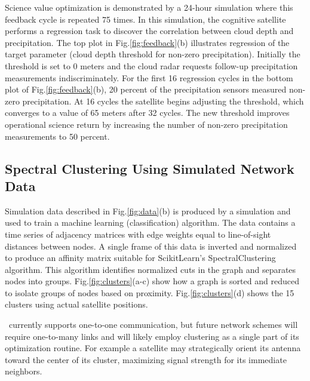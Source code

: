 \documentclass[conference]{IEEEtran}
\newcommand{\project}{{\sc{Collaborate}}~}
\begin{document}
Science value optimization is demonstrated by a 24-hour simulation where this feedback cycle is repeated 75 times.  In this simulation, the cognitive satellite performs a regression task to discover the correlation between cloud depth and precipitation.  The top plot in Fig.\ref{fig:feedback}(b) illustrates regression of the target parameter (cloud depth threshold for non-zero precipitation).  Initially the threshold is set to 0 meters and the cloud radar requests follow-up precipitation measurements indiscriminately.  For the first 16 regression cycles in the bottom plot of Fig.\ref{fig:feedback}(b), 20 percent of the precipitation sensors measured non-zero precipitation.  At 16 cycles the satellite begins adjusting the threshold, which converges to a value of 65 meters after 32 cycles.  The new threshold improves operational science return by increasing the number of non-zero precipitation measurements to 50 percent.

\subsection{Spectral Clustering Using Simulated Network Data}
\label{ssec:cluster}

Simulation data described in Fig.\ref{fig:data}(b) is produced by a simulation and used to train a machine learning (classification) algorithm.  The data contains a time series of adjacency matrices with edge weights equal to line-of-sight distances between nodes.  A single frame of this data is inverted and normalized to produce an affinity matrix suitable for ScikitLearn's SpectralClustering algorithm.  This algorithm identifies normalized cuts in the graph and separates nodes into groups.  Fig.\ref{fig:clusters}(a-c) show how a graph is sorted and reduced to isolate groups of nodes based on proximity.  Fig.\ref{fig:clusters}(d) shows the 15 clusters using actual satellite positions.

\project currently supports one-to-one communication, but future network schemes will require one-to-many links and will likely employ clustering as a single part of its optimization routine.  For example a satellite may strategically orient its antenna toward the center of its cluster, maximizing signal strength for its immediate neighbors.
\end{document}
